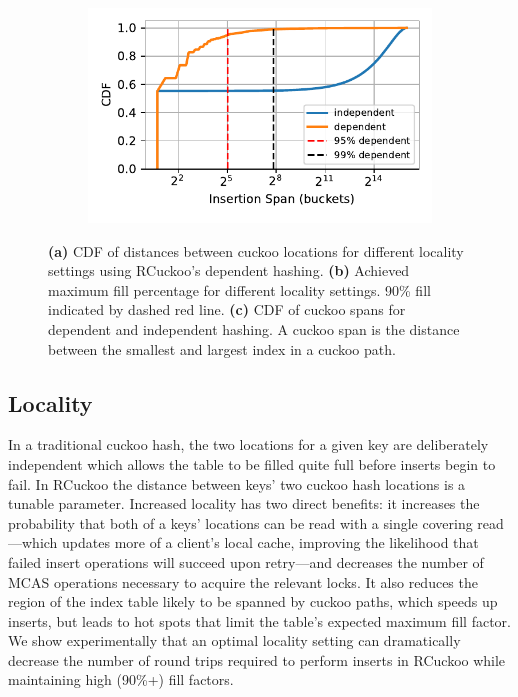 \begin{figure}[t]
        \begin{subfigure}{0.3\linewidth}
        \includegraphics[width=0.99\linewidth]{fig/insertion_span.pdf}
    \end{subfigure}
    \vspace{-1em}
    \caption{
    \textbf{(a)} CDF of distances between cuckoo locations for different locality settings using RCuckoo's dependent hashing.
    \textbf{(b)} Achieved maximum fill percentage for different locality settings. 90\% fill indicated by dashed red line.
        \textbf{(c)} CDF of cuckoo spans for dependent and independent hashing. A cuckoo span is the distance between the smallest and largest index in a cuckoo path.~
    }
    \label{fig:locality-hashing}

\end{figure}


\subsection{Locality}



In a traditional cuckoo hash, the two locations for a given key are
deliberately independent which allows the table to be filled quite
full before inserts begin to fail. 
%
In RCuckoo the distance between keys' two cuckoo hash locations is a
tunable parameter.  Increased locality has two direct benefits: it
increases the probability that both of a keys' locations can be read
with a single covering read---which updates more of a client's local
cache, improving the likelihood that failed insert operations will
succeed upon retry---and decreases the number of MCAS operations
necessary to acquire the relevant locks.  It also reduces the region
of the index table likely to be spanned by cuckoo paths, which speeds
up inserts, but leads to hot spots that limit the table's expected
maximum fill factor.  We show experimentally that an optimal locality
setting can dramatically decrease the number of round trips required
to perform inserts in RCuckoo while maintaining high (90\%+) fill
factors.


